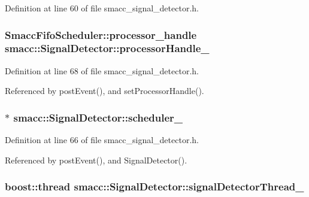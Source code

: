 Definition at line 60 of file smacc\+\_\+signal\+\_\+detector.\+h.

\subsubsection[{\texorpdfstring{processor\+Handle\+\_\+}{processorHandle_}}]{\setlength{\rightskip}{0pt plus 5cm}Smacc\+Fifo\+Scheduler\+::processor\+\_\+handle smacc\+::\+Signal\+Detector\+::processor\+Handle\+\_\+\hspace{0.3cm}{\ttfamily [private]}}\hypertarget{classsmacc_1_1SignalDetector_a9a77dc9f0e9f8f56dff5e76077abcb78}{}\label{classsmacc_1_1SignalDetector_a9a77dc9f0e9f8f56dff5e76077abcb78}


Definition at line 68 of file smacc\+\_\+signal\+\_\+detector.\+h.



Referenced by post\+Event(), and set\+Processor\+Handle().

\subsubsection[{\texorpdfstring{scheduler\+\_\+}{scheduler_}}]{$\ast$ smacc\+::\+Signal\+Detector\+::scheduler\+\_\+\hspace{0.3cm}{\ttfamily [private]}}\hypertarget{classsmacc_1_1SignalDetector_adaee5b9b91d0e6305dc1ab30f7ab566d}{}\label{classsmacc_1_1SignalDetector_adaee5b9b91d0e6305dc1ab30f7ab566d}


Definition at line 66 of file smacc\+\_\+signal\+\_\+detector.\+h.



Referenced by post\+Event(), and Signal\+Detector().

\subsubsection[{\texorpdfstring{signal\+Detector\+Thread\+\_\+}{signalDetectorThread_}}]{\setlength{\rightskip}{0pt plus 5cm}boost\+::thread smacc\+::\+Signal\+Detector\+::signal\+Detector\+Thread\+\_\+\hspace{0.3cm}{\ttfamily [private]}}\hypertarget{classsmacc_1_1SignalDetector_a4346a400cd37eafc5d1d2e63d975785e}{}\label{classsmacc_1_1SignalDetector_a4346a400cd37eafc5d1d2e63d975785e}


